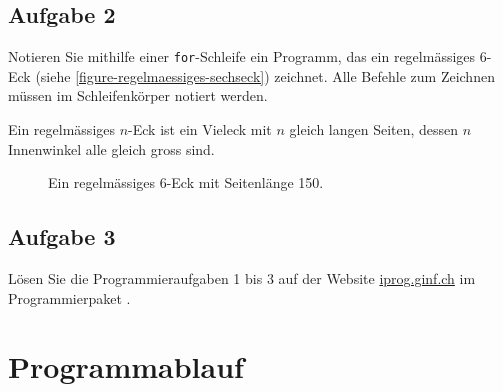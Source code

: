 \subsection{Aufgabe 2}

Notieren Sie mithilfe einer \lstinline{for}-Schleife ein Programm, das ein regelmässiges \num{6}-Eck (siehe \autoref{figure-regelmaessiges-sechseck}) zeichnet. Alle Befehle zum Zeichnen müssen im Schleifenkörper notiert werden.

\vspace{-0.5cm}

\begin{hinweis}
Ein regelmässiges $n$-Eck ist ein Vieleck mit $n$ gleich langen Seiten, dessen $n$ Innenwinkel alle gleich gross sind.
\end{hinweis}

\vspace{-0.75cm}

\begin{figure}[htb]
\centering
\begin{minipage}{0.55\textwidth}
\centering
\fillwithgrid{1.75in}
\end{minipage}
\hfill
\begin{minipage}{0.375\textwidth}
\centering
{}
\caption{Ein regelmässiges \num{6}-Eck mit Seitenlänge \num{150}.}
\label{figure-regelmaessiges-sechseck}
\end{minipage}
\end{figure}

\vspace{-0.5cm}

\subsection{Aufgabe 3}

Lösen Sie die Programmieraufgaben 1 bis 3 auf der Website \url{iprog.ginf.ch} im Programmierpaket .

\vspace{-0.5cm}

\section{Programmablauf}

